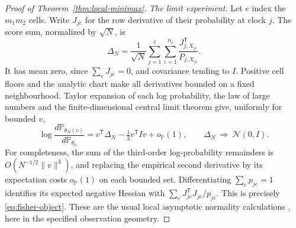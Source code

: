 \begin{proof}[Proof of Theorem~\ref{thm:local-minimax}]
\emph{The limit experiment.} Let $e$ index the $m_1m_2$ cells. Write
$J_{je}$ for the row derivative of their probability at clock $j$.
The score sum, normalized by $\sqrt N$, is
\[
 \Delta_N=\frac1{\sqrt N}\sum_{j=1}^\ell\sum_{i=1}^{n_j}
                         \frac{J_{j,X_{ji}}^{\mathsf T}}{P_{j,X_{ji}}}.
\]
It has mean zero, since $\sum_eJ_{je}=0$, and covariance tending to $I$.
Positive cell floors and the analytic chart make all derivatives
bounded on a fixed neighbourhood. Taylor expansion of each log
probability, the law of large numbers and the finite-dimensional
central limit theorem give, uniformly for bounded $v$,
\begin{equation}\label{eq:categorical-lan}
 \log\frac{d\mathbb P_{\theta_N(v)}}{d\mathbb P_{\theta_0}}
       =v^{\mathsf T}\Delta_N-\tfrac12v^{\mathsf T}Iv+o_{\mathbb P}(1),
 \qquad \Delta_N\ \Longrightarrow\ \mathcal N(0,I).
\end{equation}
For completeness, the sum of the third-order log-probability
remainders is $O(N^{-1/2}\|v\|^3)$, and replacing the empirical second
derivative by its expectation costs $o_{\mathbb P}(1)$ on each bounded
set. Differentiating $\sum_ep_{je}=1$ identifies its expected negative
Hessian with $\sum_eJ_{je}^{\mathsf T}J_{je}/p_{je}$. This is precisely
\eqref{eq:fisher-object}. These are the usual local asymptotic normality
calculations \cite{Hajek72,vdV98}, here in the specified observation
geometry.


\end{proof}
